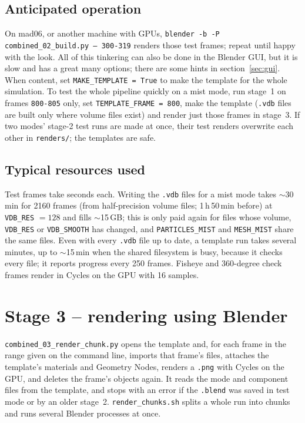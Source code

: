 \documentclass[11pt]{article}
\newcommand{\pc}[1]{\texttt{#1}}
\begin{document}
\subsection{Anticipated operation}
On mad06, or another machine with GPUs,\newline
\pc{blender -b -P combined\_02\_build.py -- 300-319}\newline
renders those test frames; repeat until happy with the look. All of this tinkering can also be done in the Blender GUI, but it is slow and has a great many options; there are some hints in section~\ref{sec:gui}. When content, set \pc{MAKE\_TEMPLATE = True} to make the template for the whole simulation. To test the whole pipeline quickly on a mist mode, run stage~1 on frames \pc{800-805} only, set \pc{TEMPLATE\_FRAME = 800}, make the template (\pc{.vdb} files are built only where volume files exist) and render just those frames in stage~3. If two modes' stage-2 test runs are made at once, their test renders overwrite each other in \pc{renders/}; the templates are safe.
 
\subsection{Typical resources used}
Test frames take seconds each. Writing the \pc{.vdb} files for a mist mode takes $\sim$30\,min for 2160 frames (from half-precision volume files; 1\,h\,50\,min before) at \pc{VDB\_RES} $=128$ and fills $\sim$15\,GB; this is only paid again for files whose volume, \pc{VDB\_RES} or \pc{VDB\_SMOOTH} has changed, and \pc{PARTICLES\_MIST} and \pc{MESH\_MIST} share the same files. Even with every \pc{.vdb} file up to date, a template run takes several minutes, up to $\sim$15\,min when the shared filesystem is busy, because it checks every file; it reports progress every 250 frames. Fisheye and 360-degree check frames render in Cycles on the GPU with 16 samples.
 
\section{Stage 3 -- rendering using Blender}
\pc{combined\_03\_render\_chunk.py} opens the template and, for each frame in the range given on the command line, imports that frame's files, attaches the template's materials and Geometry Nodes, renders a \pc{.png} with Cycles on the GPU, and deletes the frame's objects again. It reads the mode and component files from the template, and stops with an error if the \pc{.blend} was saved in test mode or by an older stage~2. \pc{render\_chunks.sh} splits a whole run into chunks and runs several Blender processes at once.
 
\end{document}
